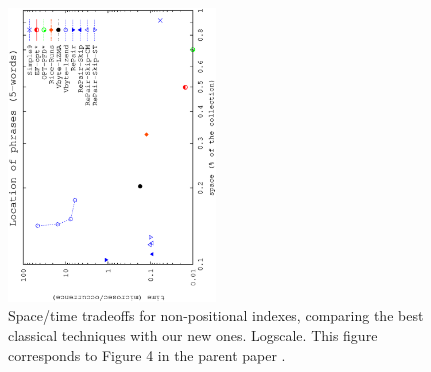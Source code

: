\documentclass[review]{elsarticle}
\begin{document}
\begin{figure}[t]
\begin{center}
\includegraphics[angle=-90,width=0.49\textwidth]{../figures/f2/phrases5-5/nonpos-5_5.eps}
\caption{Space/time tradeoffs for non-positional indexes, comparing the best
classical techniques with our new ones. Logscale. This figure corresponds to Figure 4 in the parent paper \cite{CFMNis16.3}.}
\label{fig:nonpos2}
\end{center}
\end{figure}
\end{document}
